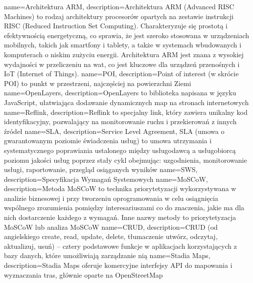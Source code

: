{
    name={Architektura ARM},
    description={Architektura ARM (Advanced RISC Machines) to rodzaj architektury procesorów opartych na zestawie instrukcji RISC (Reduced Instruction Set Computing). Charakteryzuje się prostotą i efektywnością energetyczną, co sprawia, że jest szeroko stosowana w urządzeniach mobilnych, takich jak smartfony i tablety, a także w systemach wbudowanych i komputerach o niskim zużyciu energii. Architektura ARM jest znana z wysokiej wydajności w przeliczeniu na wat, co jest kluczowe dla urządzeń przenośnych i IoT (Internet of Things).}
}
{
    name={POI},
    description={Point of interest (w skrócie POI) to punkt w przestrzeni, najczęściej na powierzchni Ziemi}
}
{
    name={OpenLayers},
    description={OpenLayers to biblioteka napisana w języku JavaScript, ułatwiająca dodawanie dynamicznych map na stronach internetowych}
}
{
    name={Reflink},
    description={Reflink to specjalny link, który zawiera unikalny kod identyfikacyjny, pozwalający na monitorowanie ruchu i przekierowań z innych źródeł}
}
{
    name={SLA},
    description={Service Level Agreement, SLA (umowa o gwarantowanym poziomie świadczenia usług) to umowa utrzymania i systematycznego poprawiania ustalonego między usługodawcą a usługobiorcą poziomu jakości usług poprzez stały cykl obejmując: uzgodnienia,
    monitorowanie usługi, raportowanie, przegląd osiąganych wyników}
}
{
    name={SWS},
    description={Specyfikacja Wymagań Systemowych}
}
{
    name={MoSCoW},
    description={Metoda MoSCoW to technika priorytetyzacji wykorzystywana w analizie biznesowej i przy tworzeniu oprogramowania w celu osiągnięcia wspólnego zrozumienia pomiędzy interesariuszami co do znaczenia, jakie ma dla nich dostarczenie każdego z wymagań. Inne nazwy metody to priorytetyzacja MoSCoW lub analiza MoSCoW}
}
{
    name={CRUD},
    description={CRUD (od angielskiego create, read, update, delete, tłumaczenie utwórz, odczytaj, aktualizuj, usuń) – cztery podstawowe funkcje w aplikacjach korzystających z bazy danych, które umożliwiają zarządzanie nią}
}
{
    name={Stadia Maps},
    description={Stadia Maps oferuje komercyjne interfejsy API do mapowania i wyznaczania tras, głównie oparte na OpenStreetMap}
}

